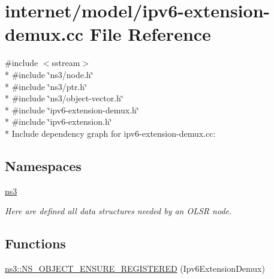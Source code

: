 \hypertarget{ipv6-extension-demux_8cc}{}\section{internet/model/ipv6-\/extension-\/demux.cc File Reference}
\label{ipv6-extension-demux_8cc}
{\ttfamily \#include $<$sstream$>$}\\*
{\ttfamily \#include \char`\"{}ns3/node.\+h\char`\"{}}\\*
{\ttfamily \#include \char`\"{}ns3/ptr.\+h\char`\"{}}\\*
{\ttfamily \#include \char`\"{}ns3/object-\/vector.\+h\char`\"{}}\\*
{\ttfamily \#include \char`\"{}ipv6-\/extension-\/demux.\+h\char`\"{}}\\*
{\ttfamily \#include \char`\"{}ipv6-\/extension.\+h\char`\"{}}\\*
Include dependency graph for ipv6-\/extension-\/demux.cc\+:
\subsection*{Namespaces}
\begin{DoxyCompactItemize}
\item 
 \hyperlink{namespacens3}{ns3}
\begin{DoxyCompactList}\small\item\em Here are defined all data structures needed by an O\+L\+SR node. \end{DoxyCompactList}\end{DoxyCompactItemize}
\subsection*{Functions}
\begin{DoxyCompactItemize}
\item 
\hyperlink{namespacens3_a8e6aa024059b6811d7af5c7698952d76}{ns3\+::\+N\+S\+\_\+\+O\+B\+J\+E\+C\+T\+\_\+\+E\+N\+S\+U\+R\+E\+\_\+\+R\+E\+G\+I\+S\+T\+E\+R\+ED} (Ipv6\+Extension\+Demux)
\end{DoxyCompactItemize}
